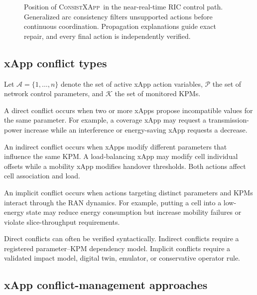 \documentclass[pdflatex,sn-mathphys-num,iicol,oneside]{sn-jnl}
\newcommand{\method}{\textsc{ConsistXApp}}
\begin{document}
\begin{figure}[t]
{
}
\caption{
Position of \method\ in the near-real-time RIC control path.
Generalized arc consistency filters unsupported actions before
continuous coordination. Propagation explanations guide exact repair,
and every final action is independently verified.
}
\label{fig:architecture}
\end{figure}

\subsection{xApp conflict types}

Let $\mathcal{A}=\{1,\ldots,n\}$ denote the set of active xApp action
variables, $\mathcal{P}$ the set of network control parameters, and
$\mathcal{K}$ the set of monitored KPMs.

A direct conflict occurs when two or more xApps propose incompatible
values for the same parameter. For example, a coverage xApp may
request a transmission-power increase while an interference or
energy-saving xApp requests a decrease.

An indirect conflict occurs when xApps modify different parameters
that influence the same KPM. A load-balancing xApp may modify cell
individual offsets while a mobility xApp modifies handover
thresholds. Both actions affect cell association and load.

An implicit conflict occurs when actions targeting distinct
parameters and KPMs interact through the RAN dynamics. For example,
putting a cell into a low-energy state may reduce energy consumption
but increase mobility failures or violate slice-throughput
requirements.

Direct conflicts can often be verified syntactically. Indirect
conflicts require a registered parameter--KPM dependency model.
Implicit conflicts require a validated impact model, digital twin,
emulator, or conservative operator rule.

\subsection{xApp conflict-management approaches}
\end{document}
